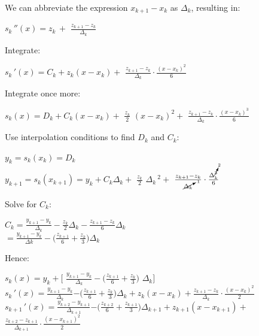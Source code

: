 \documentclass[a4paper,12pt]{report}
\begin{document}
	\noindent We can abbreviate the expression $x_{k+1}-x_k$ as $\Delta_k$, resulting in:

\begin{center}
	
	$s_k\, ''(x)= z_k \, +$ \large$\frac{z_{k+1}-z_k}{\Delta_k}$
\end{center}

	\noindent Integrate:
\begin{center}
	
	$s_k\, '(x) = C_k + z_k(x-x_k) + $ \large $\frac{z_{k+1}-z_k}{\Delta_k} \cdot \frac{(x-x_k)^2}{6} $
\end{center}

	\noindent Integrate once more:

\begin{center}
	$s_k(x) = D_k +  C_k(x-x_k) + $ \large $ \frac{z_k}{2}$ \normalsize $(x-x_k)^2 + $ \large $\frac{z_{k+1}-z_k}{\Delta_k}
	\cdot \frac{(x-x_k)^3}{6} $
\end{center}

	\noindent Use interpolation conditions to find $D_k$ and $C_k$:

\begin{center}
	$y_k = s_k(x_k)=D_k$\\
	\medskip
	$y_{k+1} = s_k(x_{k+1}) = y_k + C_k \Delta_k + $ \large $\frac{z_k}{2}$ \normalsize $\Delta_k\, ^2 + $
	\large $\frac{z_{k+1}-z_k}{\cancelto{1}{\Delta_k}} \cdot
		 \frac{\Delta_k^{\cancelto{2}{3}}}{6}$
\end{center}

	\noindent Solve for $C_k$:

\begin{center}
	$C_k = $\large$\frac{y_{k+1}-y_k}{\Delta_k} - \frac{z_k}{2}$\normalsize$\Delta_k - $\large$\frac{z_{k+1}-z_k}{6}$\normalsize$\Delta_k$\\
	\bigskip
	$= \frac{y_{k+1}-y_k}{\Delta k} - \Big( \frac{z_{k+1}}{6} + \frac{z_k}{3}    \Big)\Delta_k$
\end{center}

	\noindent Hence:

\begin{center}
	$s_k(x) = y_k +\Big[$ \large $ \frac{y_{k+1} - y_k}{\Delta_k} - \big( \frac{z_{k+1}}{6} + \frac{z_k}{3}  \big)$ \normalsize $ \!\! \Delta_k \Big]$\\
\bigskip
	$s_k\, '(x) = $\large$\frac{y_{k+1} - y_k}{\Delta_k}$\normalsize$ - \big( $\large$ \frac{z_{k+1}}{6} + \frac{z_k}{3} $\normalsize$ \big)
	\Delta_k + z_k(x-x_k) + $\large$ \frac{z_{k+1} - z_k}{\Delta_k}\cdot \frac{(x-x_k)^2}{2}$\\
	\bigskip
	\normalsize
	$s_{k+1}\, '(x) = $\large$ \frac{y_{k+2} - y_{k+1}}{\Delta_{k+1}}$\normalsize$ - \big( $\large$ \frac{z_{k+2}}{6}
	 + \frac{z_{k+1}}{3}$\normalsize$ \big) \Delta_{k+1} + z_{k+1}(x-x_{k+1})
	 + $\large$ \frac{z_{k+2}-z_{k+1}}{\Delta_{k+1}} \cdot \frac{(x-x_{k+1})^2}{2}$\\
	 \bigskip
\end{center}
\end{document}
